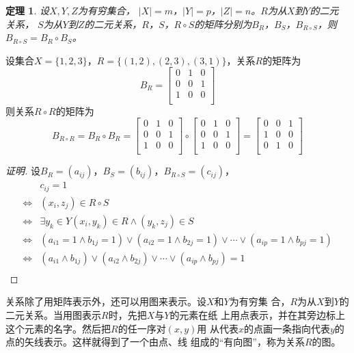 \documentclass{article}
\newtheorem{Thm}{定理}
\begin{document}
\begin{CJK*}{UTF8}{gbsn}
  \begin{Thm}
    设$X, Y, Z$为有穷集合， $|X| =m$，$|Y|=p$，$|Z| = n$。$R$为从$X$到$Y$的二元
    关系， $S$为从$Y$到$Z$的二元关系，$R$，$S$，$R \circ S$的矩阵分别为$B_{R}$，$B_{S}$，$B_{R\circ S}$，则$B_{R\circ S} = B_R \circ B_S$。
  \end{Thm}
  设集合$X=\{1,2,3\}$，$R=\{(1,2),(2,3),(3,1)\}$，关系$R$的矩阵为
  \[B_R=\begin{bmatrix}
    0&1&0\\
    0&0&1\\
    1&0&0\\
  \end{bmatrix}
\]
则关系$R\circ R$的矩阵为
\[B_{R\circ R}=B_R\circ B_R=\begin{bmatrix}
  0&1&0\\
  0&0&1\\
  1&0&0\\
\end{bmatrix}
\circ
\begin{bmatrix}
  0&1&0\\
  0&0&1\\
  1&0&0\\
\end{bmatrix}
=\begin{bmatrix}
  0&0&1\\
  1&0&0\\
  0&1&0\\
\end{bmatrix}
\]
\begin{proof}[证明]
  设$B_{R}=(a_{ij})$，$B_{S}=(b_{ij})$，$B_{R\circ S}=(c_{ij})$，
\begin{align*}
  &c_{ij}=1\\
  \Leftrightarrow&(x_i,z_j)\in R\circ S\\
  \Leftrightarrow&\exists y_k\in Y (x_i,y_k)\in R\land (y_k,z_j)\in S\\
\Leftrightarrow&(a_{i1}=1\land b_{1j}=1)\lor (a_{i2}=1\land b_{2j}=1)\lor \cdots \lor (a_{ip}=1\land b_{pj}=1)\\
  \Leftrightarrow&(a_{i1}\land b_{1j})\lor (a_{i2}\land b_{2j})\lor \cdots \lor (a_{ip}\land b_{pj}) = 1\\
\end{align*}
\end{proof}

关系除了用矩阵表示外，还可以用图来表示。设$X$和$Y$为有穷集
合，$R$为从$X$到$Y$的二元关系。当用图表示$R$时，先把$X$与$Y$的元素在纸
上用点表示，并在其旁边标上这个元素的名字。然后把$R$的任一序对$(x,y)$用
从代表$x$的点画一条指向代表$y$的点的矢线表示。这样就得到了一个由点、线
组成的“有向图”，称为关系$R$的图。



\end{CJK*}
\end{document}
